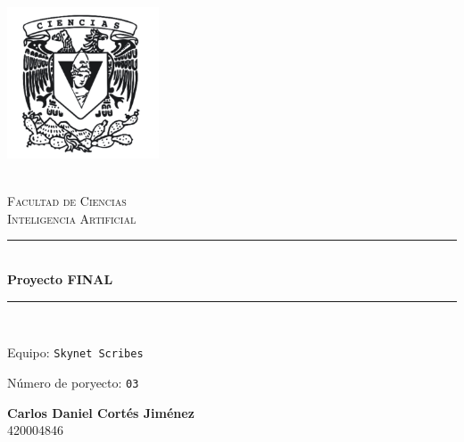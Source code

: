 \begin{titlepage}
    \center 
    \newcommand{\HRule}{\rule{\linewidth}{0.5mm}} 

    \includegraphics[width=4.5cm]{assets/imagenes/CienciasEscudo.png}

    \quad \\[0.2cm]
    \textsc{\huge Facultad de Ciencias}\\[.6cm] 
    \textsc{\huge Inteligencia Artificial}\\[0.5cm]

    \makeatletter
        \HRule \\ [0.4cm]
            { \huge \bfseries Proyecto FINAL}\\
        \HRule \\ [0.4cm]

    \vspace{2mm}

    \begin{flushleft}
        \Large{Equipo:} \texttt{\Large Skynet Scribes}
    \end{flushleft}
    \begin{flushleft}
        \Large{Número de poryecto:} \texttt{\Large 03}\\[0.8cm]
    \end{flushleft}


    \begin{minipage}{0.8\textwidth}
        \begin{flushright}
            \textbf{\large{Carlos Daniel Cortés Jiménez}}\\    
            420004846        
        \end{flushright}
    \end{minipage}


\end{titlepage}
